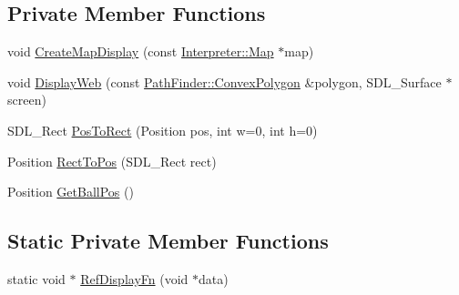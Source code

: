 \subsection*{Private Member Functions}
\begin{DoxyCompactItemize}
\item 
void \hyperlink{classRefereeDisplay_a9c18f26c62f9507f903ec9b29c1bfea8}{CreateMapDisplay} (const \hyperlink{classMatrix}{Interpreter::Map} $\ast$map)
\item 
void \hyperlink{classRefereeDisplay_ae40cc8040d1fe441a8f38fe2fc0b8974}{DisplayWeb} (const \hyperlink{structPathFinder_1_1ConvexPolygon}{PathFinder::ConvexPolygon} \&polygon, SDL\_\-Surface $\ast$screen)
\item 
SDL\_\-Rect \hyperlink{classRefereeDisplay_a56d7e17a5fb16cbe64fb7ef3e4f28af0}{PosToRect} (Position pos, int w=0, int h=0)
\item 
Position \hyperlink{classRefereeDisplay_a4abb9b85d92cbdd30fe6fd29a17c3767}{RectToPos} (SDL\_\-Rect rect)
\item 
Position \hyperlink{classRefereeDisplay_afa7601bcd5b6361398f48f2fb1d6ead4}{GetBallPos} ()
\end{DoxyCompactItemize}
\subsection*{Static Private Member Functions}
\begin{DoxyCompactItemize}
\item 
static void $\ast$ \hyperlink{classRefereeDisplay_a0aecfa7e27f573859a1bb037aca9693a}{RefDisplayFn} (void $\ast$data)
\end{DoxyCompactItemize}
